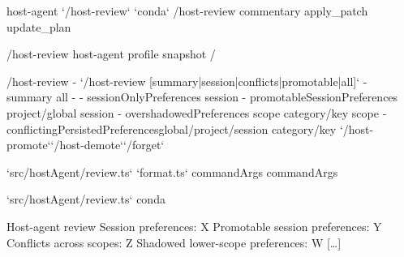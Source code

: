 \begin{decodedreasoningpanel}
 host-agent  `/host-review` `conda`  /host-review commentary  apply\_patch update\_plan 

 /host-review  host-agent  profile snapshot /

 /host-review
- `/host-review [summary|session|conflicts|promotable|all]`
-  summary  all
- 
  - sessionOnlyPreferences session 
  - promotableSessionPreferences project/global  session 
  - overshadowedPreferences scope  category/key  scope 
  - conflictingPersistedPreferencesglobal/project/session  category/key 
 `/host-promote``/host-demote``/forget`

 `src/hostAgent/review.ts`  `format.ts`  commandArgs  commandArgs 

 `src/hostAgent/review.ts`  conda 

Host-agent review
Session preferences: X
Promotable session preferences: Y
Conflicts across scopes: Z
Shadowed lower-scope preferences: W {[\ldots]}
\end{decodedreasoningpanel}
